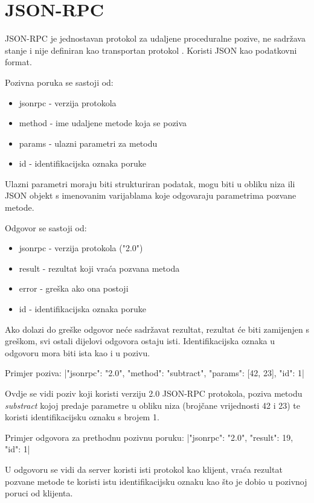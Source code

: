 \section{JSON-RPC}

JSON-RPC je jednostavan protokol za udaljene proceduralne pozive, ne sadržava
stanje i nije definiran kao transportan protokol \cite{jsonRPC}. Koristi JSON
\cite{jsonRFC} kao podatkovni format.

Pozivna poruka se sastoji od:
\begin{itemize}
        \item jsonrpc - verzija protokola
        \item method - ime udaljene metode koja se poziva
        \item params - ulazni parametri za metodu
        \item id - identifikacijska oznaka poruke
\end{itemize}

Ulazni parametri moraju biti strukturiran podatak, mogu biti u obliku niza ili
JSON objekt s imenovanim varijablama koje odgovaraju parametrima pozvane
metode.

Odgovor se sastoji od:
\begin{itemize}
    \item jsonrpc - verzija protokola ("2.0")
    \item result - rezultat koji vraća pozvana metoda
    \item error - greška ako ona postoji
    \item id - identifikacijska oznaka poruke
\end{itemize}

Ako dolazi do greške odgovor neće sadržavat rezultat, rezultat će biti
zamijenjen s greškom, svi ostali dijelovi odgovora ostaju isti.
Identifikacijska oznaka u odgovoru mora biti ista kao i u pozivu.

Primjer poziva:
|{"jsonrpc": "2.0", "method": "subtract", "params": [42, 23], "id": 1}|

Ovdje se vidi poziv koji koristi verziju 2.0 JSON-RPC protokola, poziva metodu
\emph{substract} kojoj predaje parametre u obliku niza (brojčane vrijednosti 42
i 23) te koristi identifikacijsku oznaku s brojem 1.

Primjer odgovora za prethodnu pozivnu poruku:
|{"jsonrpc": "2.0", "result": 19, "id": 1}|

U odgovoru se vidi da server koristi isti protokol kao klijent, vraća rezultat
pozvane metode te koristi istu identifikacijsku oznaku kao što je dobio u
pozivnoj poruci od klijenta.
